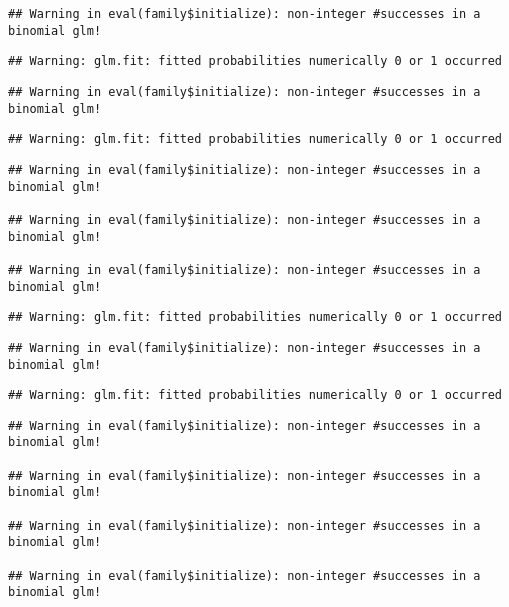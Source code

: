 \documentclass[
]{article}
\begin{document}
\begin{verbatim}
## Warning in eval(family$initialize): non-integer #successes in a binomial glm!
\end{verbatim}

\begin{verbatim}
## Warning: glm.fit: fitted probabilities numerically 0 or 1 occurred
\end{verbatim}

\begin{verbatim}
## Warning in eval(family$initialize): non-integer #successes in a binomial glm!
\end{verbatim}

\begin{verbatim}
## Warning: glm.fit: fitted probabilities numerically 0 or 1 occurred
\end{verbatim}

\begin{verbatim}
## Warning in eval(family$initialize): non-integer #successes in a binomial glm!

## Warning in eval(family$initialize): non-integer #successes in a binomial glm!

## Warning in eval(family$initialize): non-integer #successes in a binomial glm!
\end{verbatim}

\begin{verbatim}
## Warning: glm.fit: fitted probabilities numerically 0 or 1 occurred
\end{verbatim}

\begin{verbatim}
## Warning in eval(family$initialize): non-integer #successes in a binomial glm!
\end{verbatim}

\begin{verbatim}
## Warning: glm.fit: fitted probabilities numerically 0 or 1 occurred
\end{verbatim}

\begin{verbatim}
## Warning in eval(family$initialize): non-integer #successes in a binomial glm!

## Warning in eval(family$initialize): non-integer #successes in a binomial glm!

## Warning in eval(family$initialize): non-integer #successes in a binomial glm!

## Warning in eval(family$initialize): non-integer #successes in a binomial glm!
\end{verbatim}
\end{document}
